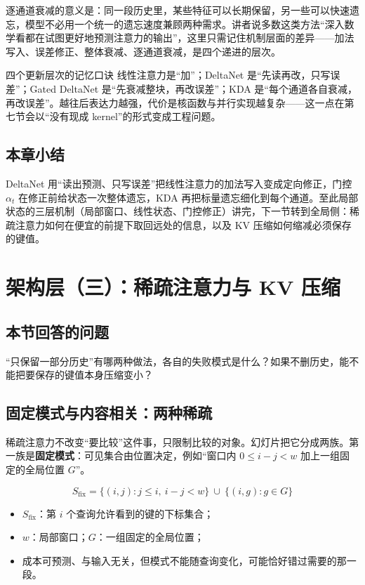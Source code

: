 \documentclass[a4paper]{article}
\begin{document}
逐通道衰减的意义是：同一段历史里，某些特征可以长期保留，另一些可以快速遗忘，模型不必用一个统一的遗忘速度兼顾两种需求。讲者说多数这类方法“深入数学看都在试图更好地预测注意力的输出”，这里只需记住机制层面的差异——加法写入、误差修正、整体衰减、逐通道衰减，是四个递进的层次。

\begin{importantbox}{四个更新层次的记忆口诀}
线性注意力是“加”；DeltaNet 是“先读再改，只写误差”；Gated DeltaNet 是“先衰减整块，再改误差”；KDA 是“每个通道各自衰减，再改误差”。越往后表达力越强，代价是核函数与并行实现越复杂——这一点在第七节会以“没有现成 kernel”的形式变成工程问题。
\end{importantbox}

\subsection{本章小结}
DeltaNet 用“读出预测、只写误差”把线性注意力的加法写入变成定向修正，门控 $\alpha_t$ 在修正前给状态一次整体遗忘，KDA 再把标量遗忘细化到每个通道。至此局部状态的三层机制（局部窗口、线性状态、门控修正）讲完，下一节转到全局侧：稀疏注意力如何在便宜的前提下取回远处的信息，以及 KV 压缩如何缩减必须保存的键值。
\section{架构层（三）：稀疏注意力与 KV 压缩}

\subsection*{本节回答的问题}
“只保留一部分历史”有哪两种做法，各自的失败模式是什么？如果不删历史，能不能把要保存的键值本身压缩变小？

\subsection{固定模式与内容相关：两种稀疏}

稀疏注意力不改变“要比较”这件事，只限制比较的对象。幻灯片把它分成两族。第一族是\textbf{固定模式}：可见集合由位置决定，例如“窗口内 $0\le i-j<w$ 加上一组固定的全局位置 $G$”。

\[
S_{\text{fix}}=\{(i,j):j\le i,\ i-j<w\}\ \cup\ \{(i,g):g\in G\}
\]

\begin{itemize}
\item $S_{\text{fix}}$：第 $i$ 个查询允许看到的键的下标集合；
\item $w$：局部窗口；$G$：一组固定的全局位置；
\item 成本可预测、与输入无关，但模式不能随查询变化，可能恰好错过需要的那一段。
\end{itemize}
\end{document}

